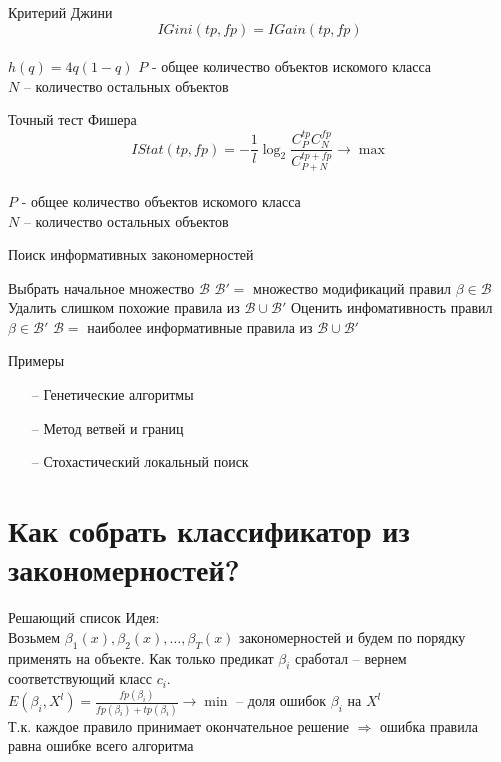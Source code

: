\documentclass[10pt]{beamer}
\begin{document}
\begin{frame}{Критерий Джини}
	$$IGini(tp,fp)=IGain(tp,fp) $$\\
	\bigbreak
	$h(q)=4q(1-q)$
	\bigbreak
	$P$ - общее количество объектов искомого класса\\
	$N$ -- количество остальных объектов
\end{frame}

{
\begin{frame}{Точный тест Фишера}
	$$IStat(tp,fp) = -\frac{1}{l}\log_2\frac{C_P^{tp}C_N^{fp}}{C_{P+N}^{tp+fp}} \rightarrow \max$$\\
	\bigbreak
	$P$ - общее количество объектов искомого класса\\
	$N$ -- количество остальных объектов
\end{frame}
}

\begin{frame}{Поиск информативных закономерностей}
  \begin{algorithmic}[1]
    \State Выбрать начальное множество $\mathscr{B}$
      \State $\mathscr{B}'=$ множество модификаций правил $\beta \in \mathscr{B}$
      \State Удалить слишком похожие правила из $\mathscr{B} \cup \mathscr{B}'$
      \State Оценить инфомативность правил $\beta \in \mathscr{B}'$
      \State $\mathscr{B}=$ наиболее информативные правила из $\mathscr{B} \cup \mathscr{B}'$
    \EndRepeat
  \EndFunction
  \end{algorithmic}    
\end{frame}

\begin{frame}{Примеры}
	\begin{enumerate}[<+- |alert@+>]
		\item[--] Генетические алгоритмы
		\item[--] Метод ветвей и границ	
		\item[--] Стохастический локальный поиск	
	\end{enumerate}
\end{frame}

\section{Как собрать классификатор из закономерностей?}

\begin{frame}{Решающий список}
	\alert{Идея}:\\
	Возьмем $\beta_1(x), \beta_2(x), \dots, \beta_T(x)$ закономерностей и будем по порядку применять на объекте. 
	Как только предикат $\beta_i$ сработал -- вернем соответствующий класс $c_i$.\\
	\bigbreak
	\pause
	$E(\beta_i, X^l) = \frac{fp(\beta_i)}{fp(\beta_i)+tp(\beta_i)} \rightarrow \min$ -- доля ошибок $\beta_i$ на $X^l$\\
	\bigbreak
	Т.к. каждое правило принимает окончательное решение $\Rightarrow$ ошибка правила равна ошибке всего алгоритма
\end{frame}
\end{document}
